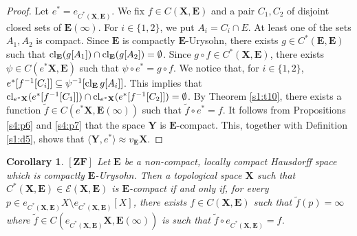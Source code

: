 \documentclass[12pt,twoside,leqno]{article}
\theoremstyle{plain}
\newtheorem{corollary}[theorem]{Corollary}
\theoremstyle{definition}
\theoremstyle{remark}
\DeclareMathOperator{\cl}{{\rm cl}}
\begin{document}
\begin{proof}
	Let $e^{\ast}=e_{C^{\ast}(\mathbf{X}, \mathbf{E})}$. We fix $f\in C(\mathbf{X}, \mathbf{E})$ and a pair $C_1, C_2$ of disjoint closed sets of $\mathbf{E}(\infty)$. For $i\in\{1,2\}$, we put $A_i=C_i\cap E$. At least one of the sets $A_1, A_2$ is compact. Since $\mathbf{E}$ is compactly $\mathbf{E}$-Urysohn, there exists $g\in C^{\ast}(\mathbf{E}, \mathbf{E})$ such that $\cl_{\mathbf{E}}(g[A_1])\cap\cl_{\mathbf{E}}(g[A_2])=\emptyset$. Since $g\circ f\in C^{\ast}(\mathbf{X},\mathbf{E})$, there exists $\psi\in C(e^{\ast}\mathbf{X}, \mathbf{E})$ such that $\psi\circ e^{\ast}=g\circ f$.  We notice that, for $i\in\{1,2\}$,  $e^{\ast}[f^{-1}[C_i]]\subseteq \psi^{-1}[\cl_{\mathbf{E}}g[A_i]]$. This implies  that $\cl_{e^{\ast}\mathbf{X}}(e^{\ast}[f^{-1}[C_1]])\cap \cl_{e^{\ast}\mathbf{X}}(e^{\ast}[f^{-1}[C_2]])=\emptyset$. By Theorem \ref{s1:t10}, there exists a function $\tilde{f}\in C(e^{\ast}\mathbf{X}, \mathbf{E}(\infty))$ such that $\tilde{f}\circ e^{\ast}=f$. It follows from Propositions \ref{s4:p6} and \ref{s4:p7} that the space $\mathbf{Y}$ is $\mathbf{E}$-compact. This, together with Definition \ref{s1:d5}, shows that $\langle \mathbf{Y}, e^{\ast}\rangle \approx v_{\mathbf{E}}\mathbf{X}$. 
\end{proof}

\begin{corollary}
	\label{s4:c15}
	$[\mathbf{ZF}]$ Let $\mathbf{E}$ be a non-compact, locally compact Hausdorff space which is compactly $\mathbf{E}$-Urysohn. Then a topological space $\mathbf{X}$ such that $C^{\ast}(\mathbf{X}, \mathbf{E})\in\mathcal{E}(\mathbf{X}, \mathbf{E})$ is $\mathbf{E}$-compact if and only if, for every $p\in e_{C^{\ast}(\mathbf{X}, \mathbf{E})}X\setminus e_{C^{\ast}(\mathbf{X}, \mathbf{E})}[X]$, there exists $f\in C(\mathbf{X}, \mathbf{E})$ such that $\tilde{f}(p)=\infty$ where $\tilde{f}\in C(e_{C^{\ast}(\mathbf{X}, \mathbf{E})}\mathbf{X}, \mathbf{E}(\infty))$ is such that  $\tilde{f}\circ e_{C^{\ast}(\mathbf{X}, \mathbf{E})}=f$.
\end{corollary}
\end{document}
